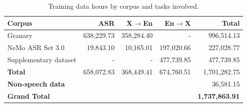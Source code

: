 \label{app:training_data_overview}
\begin{table}[ht]
  \setlength{\abovecaptionskip}{10pt} %
  \label{tab:data-by-corpus-plain}
  \begin{tabular}{lrrrr}
    \hline
    Corpus & ASR & X$\to$En & En$\to$X & Total \\
    \hline
    Granary          & 638,229.73 & 358,284.40 & -       & 996,514.13 \\
    NeMo ASR Set 3.0 & 19,843.10  & 10,165.01  & 197,020.66 & 227,028.77 \\
    Supplementary dataset & -       & -       & 477,739.85 & 477,739.85 \\
    \hline
    \textbf{Total}   & 658,072.83 & 368,449.41 & 674,760.51 & 1,701,282.75 \\
    \multicolumn{4}{l}{\textbf{Non-speech data}} & 36,581.15 \\
    \textbf{Grand Total} & \multicolumn{3}{c}{} & \textbf{1,737,863.91} \\
    \hline
  \end{tabular}
  \centering
  \caption{Training data hours by corpus and tasks involved.}
\end{table}


